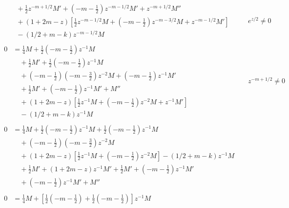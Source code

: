 \documentclass[a4paper,10pt, leqno, answers]{exam}  %
\begin{document}
\begin{questions}
\begin{solution}
\begin{align*}
\begin{split}
                &\quad {}+ \frac{1}{2} z^{-m + 1/2} M' + \left( -m - \frac{1}{2} \right) z^{-m - 1/2} M' + z^{-m + 1/2} M'' \\
                &\quad {}+ (1 + 2 m - z) \left[ \frac{1}{2} z^{-m - 1/2} M + \left( -m - \frac{1}{2} \right) z^{-m - 3/2} M + z^{-m - 1/2} M' \right] \\
                &\quad {}- (1/2 + m - k) z^{-m - 1/2} M
            \end{split} && e^{z/2} \neq 0 \\
            \begin{split}
                0 &= \frac{1}{4} M + \frac{1}{2} \left( -m - \frac{1}{2} \right) z^{-1} M \\
                &\quad {}+ \frac{1}{2} M' + \frac{1}{2} \left( -m - \frac{1}{2} \right) z^{-1} M \\
                &\quad {}+ \left( -m - \frac{1}{2} \right) \left( -m - \frac{3}{2} \right) z^{-2} M + \left( -m - \frac{1}{2} \right) z^{-1} M' \\
                &\quad {}+ \frac{1}{2} M' + \left( -m - \frac{1}{2} \right) z^{-1} M' + M'' \\
                &\quad {}+ (1 + 2 m - z) \left[ \frac{1}{2} z^{-1} M + \left( -m - \frac{1}{2} \right) z^{-2} M + z^{-1} M' \right] \\
                &\quad {}- (1/2 + m - k) z^{-1} M
            \end{split} && z^{-m + 1/2} \neq 0 \\
            \begin{split}
                0 &= \frac{1}{4} M + \frac{1}{2} \left( -m - \frac{1}{2} \right) z^{-1} M + \frac{1}{2} \left( -m - \frac{1}{2} \right) z^{-1} M \\
                &\quad {}+ \left( -m - \frac{1}{2} \right) \left( -m - \frac{3}{2} \right) z^{-2} M  \\
                &\quad {}+ (1 + 2 m - z) \left[ \frac{1}{2} z^{-1} M + \left( -m - \frac{1}{2} \right) z^{-2} M \right] - (1/2 + m - k) z^{-1} M \\
                &\quad {}+ \frac{1}{2} M' + (1 + 2 m - z) z^{-1} M' + \frac{1}{2} M' + \left( -m - \frac{1}{2} \right) z^{-1} M' \\
                &\quad {}+ \left( -m - \frac{1}{2} \right) z^{-1} M' + M''
            \end{split} \\
            \begin{split}
                0 &= \frac{1}{4} M + \left[ \frac{1}{2} \left( -m - \frac{1}{2}  \right) + \frac{1}{2} \left( -m - \frac{1}{2} \right) \right] z^{-1} M \\

\end{split}
\end{align*}
\end{solution}
\end{questions}
\end{document}
